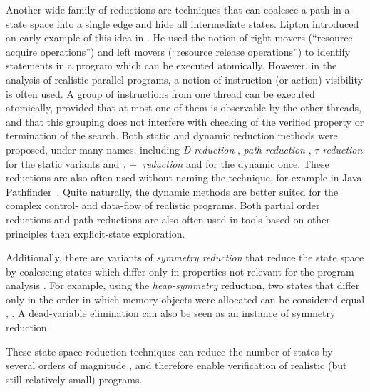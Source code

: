Another wide family of reductions are techniques that can coalesce a path in a
state space into a single edge and hide all intermediate states.
Lipton introduced an early example of this idea in .
He used the notion of right movers (``resource acquire operations'') and
left movers (``resource release operations'') to identify statements in a
program which can be executed atomically.
However, in the analysis of realistic parallel programs, a notion of instruction (or action) visibility is often used.
A group of instructions from one thread can
be executed atomically, provided that at most one of them is observable by the
other threads, and that this grouping does not interfere with checking of the
verified property or termination of the search.
Both static and dynamic reduction methods were proposed, under many names,
including \emph{D-reduction} , \emph{path reduction}
, \emph{$\tau$ reduction}  for the static
variants and \emph{$\tau+$ reduction}  and  for the dynamic once.
These reductions are also often used without naming the technique, for example in
Java Pathfinder~.
Quite naturally, the dynamic methods are better suited for the complex control-
and data-flow of realistic programs.
Both partial order reductions and path reductions are also often used in tools
based on other principles then explicit-state exploration.

Additionally, there are variants of \emph{symmetry reduction} that reduce the
state space by coalescing states which differ only in properties not relevant
for the program analysis .
For example, using the \emph{heap-symmetry} reduction, two states that differ
only in the order in which memory objects were allocated can be considered
equal , .
A dead-variable elimination  can also be seen as an instance
of symmetry reduction.

These state-space reduction techniques can reduce the number of states by
several orders of magnitude , and therefore enable verification of
realistic (but still relatively small) programs.

